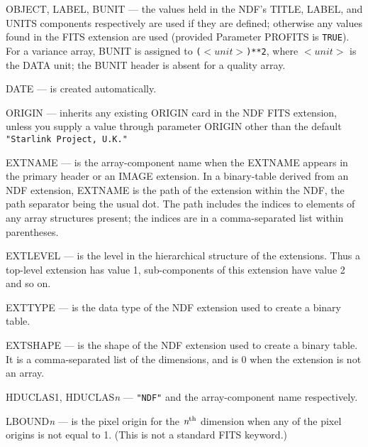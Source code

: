 \documentclass[twoside,11pt]{article}
\newcommand{\sstitem}{\item}
\newcommand{\sstitem}{\item}
\begin{document}
{{{{            \sstitem
            OBJECT, LABEL, BUNIT --- the values held in the NDF's TITLE,
              LABEL, and UNITS components respectively are used if
              they are defined; otherwise any values found in the FITS
              extension are used (provided Parameter PROFITS is \texttt{TRUE}).
              For a variance array, BUNIT is assigned to 
              \texttt{($<unit>$)**2}, where $<unit>$ is the DATA unit; the
              BUNIT header is absent for a quality array.

            \sstitem
            DATE --- is created automatically.

            \sstitem
            ORIGIN --- inherits any existing ORIGIN card in the NDF FITS
              extension, unless you supply a value through parameter
              ORIGIN other than the default \texttt{"Starlink Project, U.K."}

            \sstitem
            EXTNAME --- is the array-component name when the EXTNAME
              appears in the primary header or an IMAGE extension.  In a
              binary-table derived from an NDF extension, EXTNAME is the
              path of the extension within the NDF, the path separator
              being the usual dot.  The path includes the indices to
              elements of any array structures present; the indices are in
              a comma-separated list within parentheses.

            \sstitem
            EXTLEVEL --- is the level in the hierarchical structure of the
              extensions.  Thus a top-level extension has value 1,
              sub-components of this extension have value 2 and so on.

            \sstitem
            EXTTYPE --- is the data type of the NDF extension used to
              create a binary table.

            \sstitem
            EXTSHAPE --- is the shape of the NDF extension used to
            create a binary table.  It is a comma-separated list of the
            dimensions, and is 0 when the extension is not an array.

            \sstitem
            HDUCLAS1, HDUCLAS{\em{n}} --- \texttt{"NDF"} and the
              array-component name respectively.

            \sstitem
            LBOUND{\textit{n}} --- is the pixel origin for the 
              $\textit{n}^{\rm th}$ dimension
              when any of the pixel origins is not equal to 1.  (This is not a
              standard FITS keyword.)

}}}}
\end{document}
